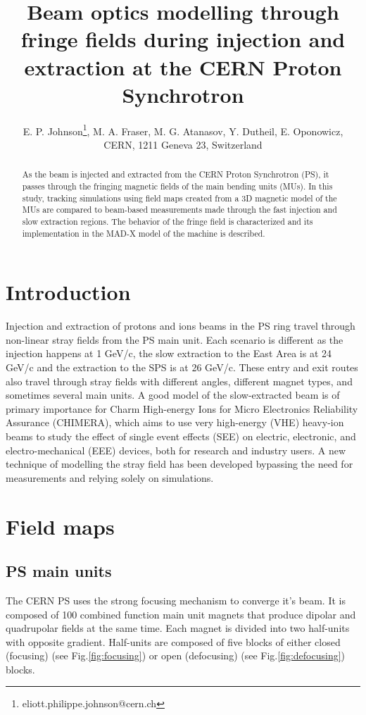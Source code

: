 \documentclass[a4paper,
               biblatex,     %
               keeplastbox,   %
               ]{jacow}
\begin{document}
\title{Beam optics modelling through fringe fields during injection and extraction at the CERN Proton Synchrotron}

\author{E. P. Johnson\thanks{eliott.philippe.johnson@cern.ch}, M. A. Fraser, M. G. Atanasov, Y. Dutheil, E. Oponowicz,\\ CERN, 1211 Geneva 23, Switzerland}
	
\maketitle

%
\begin{abstract}
As the beam is injected and extracted from the CERN Proton Synchrotron (PS), it passes through the fringing magnetic fields of the main bending units (MUs). In this study, tracking simulations using field maps created from a 3D magnetic model of the MUs are compared to beam-based measurements made through the fast injection and slow extraction regions. The behavior of the fringe field is characterized and its implementation in the MAD-X model of the machine is described.
\end{abstract}


\section{Introduction}
Injection and extraction of protons and ions beams in the PS ring travel through non-linear stray fields from the PS main unit. Each scenario is different as the injection happens at 1 GeV/c, the slow extraction to the East Area is at 24 GeV/c and the extraction to the SPS is at 26 GeV/c. These entry and exit routes also travel through stray fields with different angles, different magnet types, and sometimes several main units. A good model of the slow-extracted beam is of primary importance for Charm High-energy Ions for
Micro Electronics Reliability Assurance (CHIMERA), which aims to use very high-energy (VHE) heavy-ion beams to study the effect of single event effects (SEE) on electric, electronic, and electro-mechanical (EEE) devices, both for research and industry users. A new technique of modelling the stray field has been developed bypassing the need for measurements and relying solely on simulations.

\section{Field maps}
\subsection{PS main units}
The CERN PS uses the strong focusing mechanism to converge it's beam. It is composed of 100 combined function main unit magnets that produce dipolar and quadrupolar fields at the same time. Each magnet is divided into two half-units with opposite gradient. Half-units are composed of five blocks of either closed (focusing) (see Fig.\ref{fig:focusing}) or open (defocusing) (see Fig.\ref{fig:defocusing}) blocks.
\end{document}
